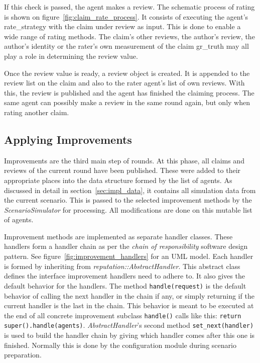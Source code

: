 \documentclass[%
    ]{\PathToTumTemplate/thesis/tum_thesis}
\begin{document}
If this check is passed, the agent makes a review.
The schematic process of rating is shown on figure~\ref{fig:claim_rate_process}.
It consists of executing the agent's \gls{rate_strategy} with the claim under review as input.
This is done to enable a wide range of rating methods.
The claim's other reviews, the author's review, the author's identity or the rater's own measurement of the claim \gls{gr_truth} may all play a role in determining the review value.

Once the review value is ready, a review object is created.
It is appended to the review list on the claim and also to the rater agent's list of own reviews.
With this, the review is published and the agent has finished the claiming process.
The same agent can possibly make a review in the same round again, but only when rating another claim.


\subsection{Applying Improvements}

Improvements are the third main step of rounds.
At this phase, all claims and reviews of the current round have been published.
These were added to their appropriate places into the data structure formed by the list of agents.
As discussed in detail in section~\ref{sec:impl_data}, it contains all simulation data from the current scenario.
This is passed to the selected improvement methods by the \emph{ScenarioSimulator} for processing.
All modifications are done on this mutable list of agents.

Improvement methods are implemented as separate handler classes.
These handlers form a handler chain as per the \emph{chain of responsibility} software design pattern.
See figure~\ref{fig:improvement_handlers} for an UML model.
Each handler is formed by inheriting from \emph{reputation::AbstractHandler}.
This abstract class defines the interface improvement handlers need to adhere to.
It also gives the default behavior for the handlers.
The method \texttt{handle(request)} is the default behavior of calling the next handler in the chain if any, or simply returning if the current handler is the last in the chain.
This behavior is meant to be executed at the end of all concrete improvement subclass \texttt{handle()} calls like this: \lstinline{return super().handle(agents)}.
\emph{AbstractHandler}'s second method \texttt{set\_next(handler)} is used to build the handler chain by giving which handler comes after this one is finished.
Normally this is done by the configuration module during scenario preparation.
\end{document}
